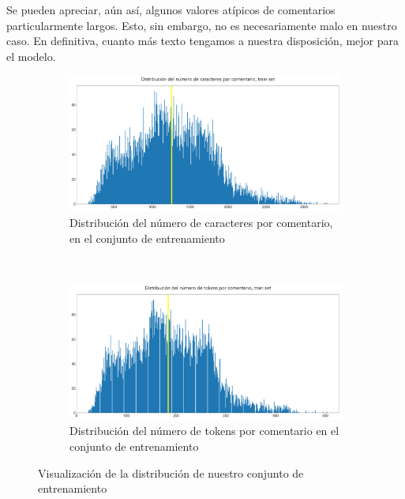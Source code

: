 Se pueden apreciar, aún así, algunos valores atípicos de comentarios particularmente largos. Esto, sin embargo, no es necesariamente malo en nuestro caso. En definitiva, cuanto más texto tengamos a nuestra disposición, mejor para el modelo.

\begin{figure}[h!]
	\centering
	\begin{subfigure}[t]{0.95\textwidth}
		\centering
		\includegraphics[width=.9\textwidth]{media/char_hist_train.pdf}
		\caption{Distribución del número de caracteres por comentario, en el conjunto de entrenamiento}
		\label{fig:avg_char_train}
	\end{subfigure}
	~

	\begin{subfigure}[t]{0.95\textwidth}
		\centering
		\includegraphics[width=.9\textwidth]{media/tokens_hist_train.pdf}
		\caption{Distribución del número de tokens por comentario en el conjunto de entrenamiento}
		\label{fig:avg_tokens_train}
	\end{subfigure}

	\caption{Visualización de la distribución de nuestro conjunto de entrenamiento}
	\label{fig:sum_train}
\end{figure}


